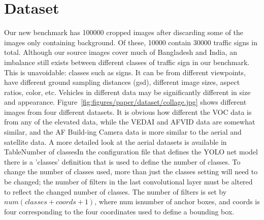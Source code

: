 \chapter[Dataset]{Dataset}

\regularsection
\headerregularsection

\updatemylof %
\updatemylot %

\begin{sloppypar} %

  Our new benchmark has 100000 cropped images after discarding some of the images only containing background. Of these, 10000 contain 30000 traffic signs in total. Although our source images cover much of Bangladesh and India, an imbalance still exists between different classes of traffic sign in our benchmark. This is unavoidable: classes such as signs. It can be from different viewpoints, have different ground sampling distances (gsd), different image sizes, aspect ratios, color, etc. Vehicles in different data may be significantly different in size and appearance. Figure~\ref{fig:figures/paper/dataset/collage.jpg} shows different images from four different datasets. It is obvious how different the VOC data is from any of the elevated data, while the VEDAI and AFVID data are somewhat similar, and the AF Build-ing Camera data is more similar to the aerial and satellite data. A more detailed look at the aerial datasets is available in TableNumber of classesIn the configuration file that defines the YOLO net model there is a 'classes' definition that is used to define the number of classes. To change the number of classes used, more than just the classes setting will need to be changed; the number of filters in the last convolutional layer must be altered to reflect the changed number of classes. The number of filters is set by $num(classes + coords + 1)$, where num isnumber of anchor boxes, and coords is four corresponding to the four coordinates used to define a bounding box.

\end{sloppypar}

